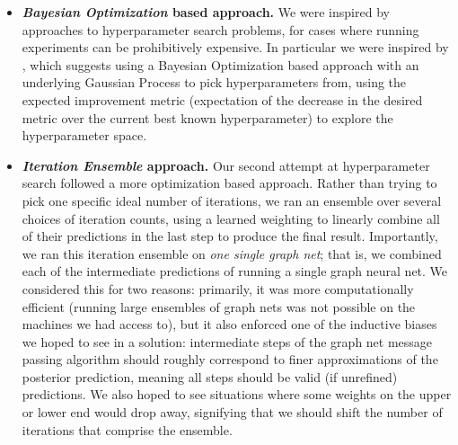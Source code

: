 \begin{itemize}
	\item \textbf{\emph{Bayesian Optimization} based approach.} 
	We were inspired by approaches to hyperparameter search problems, for cases where running experiments can be prohibitively expensive. In particular we were inspired by \cite{snoek2012practical}, which suggests using a Bayesian Optimization based approach with an underlying Gaussian Process to pick hyperparameters from, using the expected improvement metric (expectation of the decrease in the desired metric over the current best known hyperparameter) to explore the hyperparameter space.
	\item \textbf{\emph{Iteration Ensemble} approach.} Our second attempt at hyperparameter search followed a more optimization based approach.
	Rather than trying to pick one specific ideal number of iterations, we ran an ensemble over several choices of iteration counts, using a learned weighting to linearly combine all of their predictions in the last step to produce the final result.
	Importantly, we ran this iteration ensemble on \emph{one single graph net}; that is, we combined each of the intermediate predictions of running a single graph neural net.
	We considered this for two reasons: primarily, it was more computationally efficient (running large ensembles of graph nets was not possible on the machines we had access to), but it also enforced one of the inductive biases we hoped to see in a solution: intermediate steps of the graph net message passing algorithm should roughly correspond to finer approximations of the posterior prediction, meaning all steps should be valid (if unrefined) predictions. We also hoped to see situations where some weights on the upper or lower end would drop away, signifying that we should shift the number of iterations that comprise the ensemble.
\end{itemize}